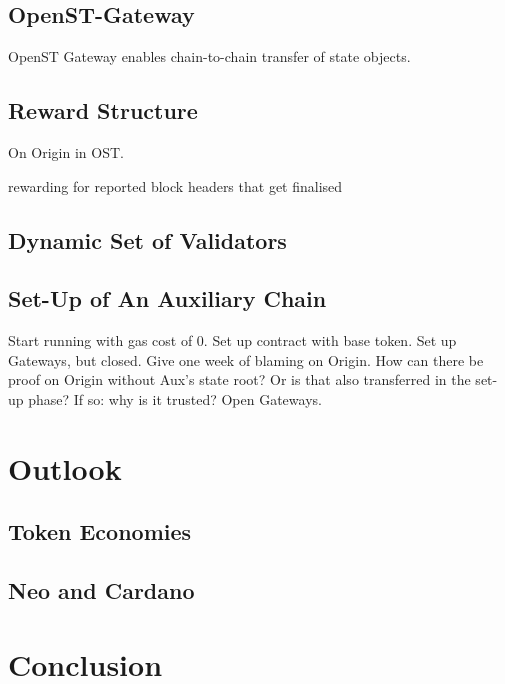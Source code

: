 \documentclass[12pt,a4paper]{article}
\begin{document}

\subsection{OpenST-Gateway}
\label{subsec:gateway}

OpenST Gateway enables chain-to-chain transfer of state objects.

\subsection{Reward Structure}
On Origin in OST.

rewarding for reported block headers that get finalised

\subsection{Dynamic Set of Validators}

\subsection{Set-Up of An Auxiliary Chain}
Start running with gas cost of 0.
Set up contract with base token.
Set up Gateways, but closed.
Give one week of blaming on Origin. How can there be proof on Origin without Aux's state root? Or is that also transferred in the set-up phase? If so: why is it trusted?
Open Gateways.

%
%
\section{Outlook}

\subsection{Token Economies}
\subsection{Neo and Cardano}

%
%
\section{Conclusion}



\end{document}
